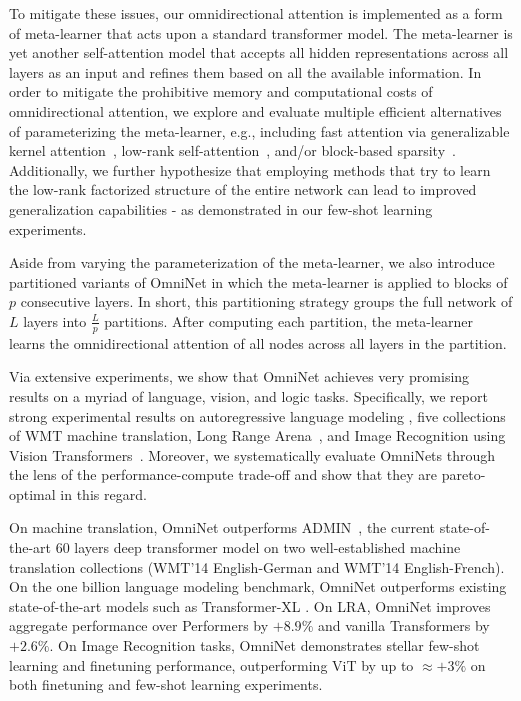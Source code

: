 \documentclass{article}
\begin{document}
To mitigate these issues, our omnidirectional attention is implemented as a form of meta-learner that acts upon a standard transformer model. The meta-learner is yet another self-attention model that accepts all hidden representations across all layers as an input and refines them based on all the available information. In order to mitigate the prohibitive memory and computational costs of omnidirectional attention, we explore and evaluate multiple efficient alternatives of parameterizing the meta-learner, e.g., including fast attention via generalizable kernel attention~\citep{choromanski2020rethinking}, low-rank self-attention~\citep{wang2020linformer}, and/or block-based sparsity~\citep{zaheer2020big}.  Additionally, we further hypothesize that employing methods that try to learn the low-rank factorized structure of the entire network can lead to improved generalization capabilities - as demonstrated in our few-shot learning experiments.

Aside from varying the parameterization of the meta-learner, we also introduce partitioned variants of OmniNet in which the meta-learner is applied to blocks of $p$ consecutive layers. In short, this partitioning strategy groups the full network of $L$ layers into $\frac{L}{p}$ partitions. After computing each partition, the meta-learner learns the omnidirectional attention of all nodes across all layers in the partition.  

Via extensive experiments, we show that OmniNet achieves very promising results on a myriad of language, vision, and logic tasks. Specifically, we report strong experimental results on autoregressive language modeling \citep{chelba2013one,raffel2019exploring}, five collections of WMT machine translation, Long Range Arena~\citep{tay2020long}, and Image Recognition using Vision Transformers~\citep{dosovitskiy2020image}. Moreover, we systematically evaluate OmniNets through the lens of the performance-compute trade-off and show that they are pareto-optimal in this regard.

On machine translation, OmniNet outperforms ADMIN~\citep{liu2020very}, the current state-of-the-art 60 layers deep transformer model on two well-established machine translation collections (WMT'14 English-German and WMT'14 English-French). On the one billion language modeling benchmark, OmniNet outperforms existing state-of-the-art models such as Transformer-XL \citep{dai2019transformer}. On LRA, OmniNet improves aggregate performance over Performers \citep{choromanski2020rethinking} by $+8.9\%$ and vanilla Transformers by $+2.6\%$. On Image Recognition tasks, OmniNet demonstrates stellar few-shot learning and finetuning performance, outperforming ViT \citep{dosovitskiy2020image} by up to $\approx +3\%$ on both finetuning and few-shot learning experiments.
\end{document}
